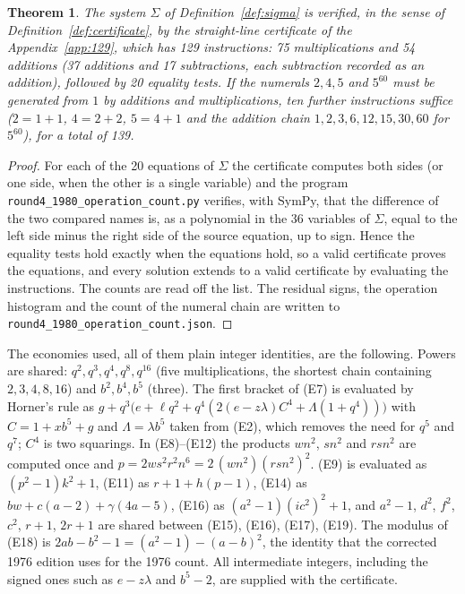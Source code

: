\documentclass[11pt,letterpaper]{article}
\newtheorem{theorem}{Theorem}[section]
\theoremstyle{definition}
\theoremstyle{remark}
\numberwithin{equation}{section}
\newcommand{\file}[1]{\texttt{#1}}
\begin{document}
\begin{theorem}\label{thm:129}
The system $\Sigma$ of Definition~\ref{def:sigma} is verified, in the sense
of Definition~\ref{def:certificate}, by the straight-line certificate of the
Appendix~\ref{app:129}, which has 129 instructions: 75 multiplications and 54 additions
(37 additions and 17 subtractions, each subtraction recorded as an
addition), followed by 20 equality tests. If the numerals $2,4,5$ and
$5^{60}$ must be generated from $1$ by additions and multiplications, ten
further instructions suffice ($2=1+1$, $4=2+2$, $5=4+1$ and the addition
chain $1,2,3,6,12,15,30,60$ for $5^{60}$), for a total of 139.
\end{theorem}

\begin{proof}
For each of the 20 equations of $\Sigma$ the certificate computes both sides
(or one side, when the other is a single variable) and the program
\file{round4\_1980\_operation\_count.py} verifies, with SymPy, that the
difference of the two compared names is, as a polynomial in the 36 variables
of $\Sigma$, equal to the left side minus the right side of the source
equation, up to sign. Hence the equality tests hold exactly when the
equations hold, so a valid certificate proves the equations, and every
solution extends to a valid certificate by evaluating the instructions. The
counts are read off the list. The residual signs, the operation histogram
and the count of the numeral chain are written to
\file{round4\_1980\_operation\_count.json}.
\end{proof}

The economies used, all of them plain integer identities, are the following.
Powers are shared: $q^2,q^3,q^4,q^8,q^{16}$ (five multiplications, the
shortest chain containing $2,3,4,8,16$) and $b^2,b^4,b^5$ (three). The first
bracket of (E7) is evaluated by Horner's rule as
$g+q^3\bigl(e+\ell q^2+q^4(2(e-z\lambda)C^4+\Lambda(1+q^4))\bigr)$ with
$C=1+xb^5+g$ and $\Lambda=\lambda b^5$ taken from (E2), which removes the
need for $q^5$ and $q^7$; $C^4$ is two squarings. In (E8)--(E12) the products
$wn^2$, $sn^2$ and $rsn^2$ are computed once and
$p=2ws^2r^2n^6=2\,(wn^2)(rsn^2)^2$. (E9) is evaluated as $(p^2-1)k^2+1$,
(E11) as $r+1+h(p-1)$, (E14) as $bw+c(a-2)+\gamma(4a-5)$, (E16) as
$(a^2-1)(ic^2)^2+1$, and $a^2-1$, $d^2$, $f^2$, $c^2$, $r+1$, $2r+1$ are
shared between (E15), (E16), (E17), (E19). The modulus of (E18) is
$2ab-b^2-1=(a^2-1)-(a-b)^2$, the identity that the corrected 1976 edition uses for the
1976 count. All intermediate integers, including the signed ones such as
$e-z\lambda$ and $b^5-2$, are supplied with the certificate.
\end{document}
